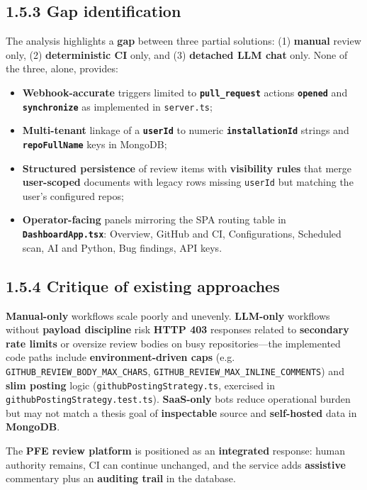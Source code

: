 \documentclass[11pt,a4paper]{report}
\begin{document}
\subsection{1.5.3 Gap identification}


The analysis highlights a \textbf{gap} between three partial solutions: (1) \textbf{manual} review only, (2) \textbf{deterministic CI} only, and (3) \textbf{detached LLM chat} only. None of the three, alone, provides:


\begin{itemize}
\item \textbf{Webhook-accurate} triggers limited to \textbf{\texttt{pull\_request}} actions \textbf{\texttt{opened}} and \textbf{\texttt{synchronize}} as implemented in \texttt{server.ts};
\item \textbf{Multi-tenant} linkage of a \textbf{\texttt{userId}} to numeric \textbf{\texttt{installationId}} strings and \textbf{\texttt{repoFullName}} keys in MongoDB;
\item \textbf{Structured persistence} of review items with \textbf{visibility rules} that merge \textbf{user-scoped} documents with legacy rows missing \texttt{userId} but matching the user’s configured repos;
\item \textbf{Operator-facing} panels mirroring the SPA routing table in \textbf{\texttt{DashboardApp.tsx}}: Overview, GitHub and CI, Configurations, Scheduled scan, AI and Python, Bug findings, API keys.
\end{itemize}


\subsection{1.5.4 Critique of existing approaches}


\textbf{Manual-only} workflows scale poorly and unevenly. \textbf{LLM-only} workflows without \textbf{payload discipline} risk \textbf{HTTP 403} responses related to \textbf{secondary rate limits} or oversize review bodies on busy repositories—the implemented code paths include \textbf{environment-driven caps} (e.g. \texttt{GITHUB\_REVIEW\_BODY\_MAX\_CHARS}, \texttt{GITHUB\_REVIEW\_MAX\_INLINE\_COMMENTS}) and \textbf{slim posting} logic (\texttt{githubPostingStrategy.ts}, exercised in \texttt{githubPostingStrategy.test.ts}). \textbf{SaaS-only} bots reduce operational burden but may not match a thesis goal of \textbf{inspectable} source and \textbf{self-hosted} data in \textbf{MongoDB}.


The \textbf{PFE review platform} is positioned as an \textbf{integrated} response: human authority remains, CI can continue unchanged, and the service adds \textbf{assistive} commentary plus an \textbf{auditing trail} in the database.
\end{document}
